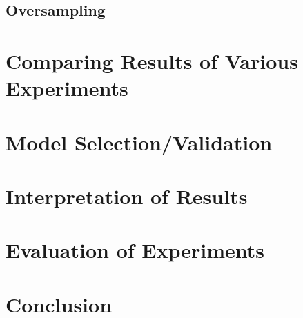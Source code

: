 \subsection{Oversampling}

\section{Comparing Results of Various Experiments}

\section{Model Selection/Validation}

\section{Interpretation of Results}

\section{Evaluation of Experiments}

\section{Conclusion}